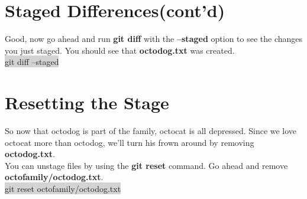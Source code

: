 \documentclass{article}
\begin{document}
\section{Staged Differences(cont'd)}
\begin{minipage}[c]{0.66\textwidth}
	\parbox{\textwidth}{
		Good, now go ahead and run \textbf{git diff} with the \textbf{--staged} option to see the changes you just staged. You should see that \textbf{octodog.txt} was created.\\
		\colorbox{lightgray}{ git diff --staged}\\
	}
\end{minipage}
\hfill
\begin{minipage}[c]{0.32\textwidth}
\end{minipage}

\section{Resetting the Stage}
\begin{minipage}[c]{0.66\textwidth}
	\parbox{\textwidth}{
		So now that octodog is part of the family, octocat is all depressed. Since we love octocat more than octodog, we'll turn his frown around by removing \textbf{octodog.txt}.\\
		You can unstage files by using the \textbf{git reset} command. Go ahead and remove \textbf{octofamily/octodog.txt}.\\
		\colorbox{lightgray}{ git reset octofamily/octodog.txt}
	}
\end{minipage}
\hfill
\begin{minipage}[c]{0.32\textwidth}
\end{minipage}
\end{document}
